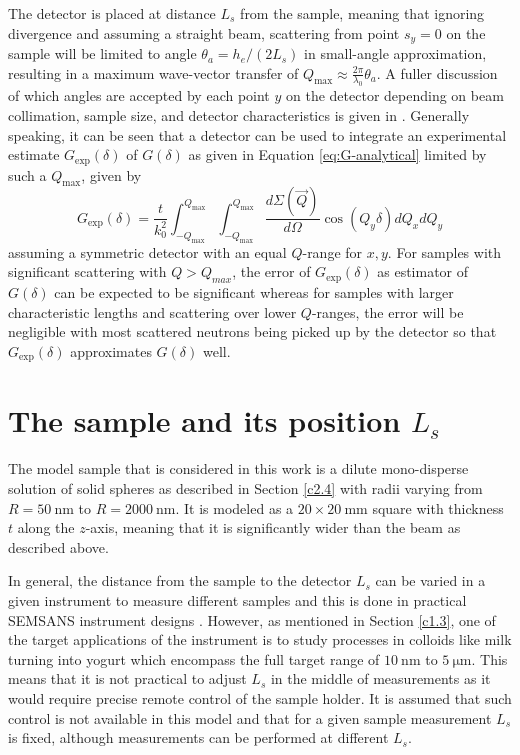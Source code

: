 The detector is placed at distance $L_s$ from the sample, meaning that ignoring divergence and assuming a straight beam, scattering from point $s_y = 0$ on the sample will be limited to angle $\theta_a = h_e/(2L_s)$ in small-angle approximation, resulting in a maximum wave-vector transfer of $Q_\text{max} \approx \frac{2\pi}{\lambda_0}\theta_a$. A fuller discussion of which angles are accepted by each point $y$ on the detector depending on beam collimation, sample size, and detector characteristics is given in \cite{kusmin2017}. Generally speaking, it can be seen that a detector can be used to integrate an experimental estimate $G_\text{exp}(\delta)$ of $G(\delta)$ as given in Equation \eqref{eq:G-analytical} limited by such a $Q_\text{max}$, given by 
\begin{equation}
	G_\text{exp}(\delta) = \frac{t}{k_0^2}\int_{-Q_\text{max}}^{Q_\text{max}}\int_{-Q_\text{max}}^{Q_\text{max}}\dfrac{d\Sigma(\vec{Q})}{d\Omega}\cos(Q_y \delta)dQ_xdQ_y  \label{eq:G-experimental}
\end{equation}
assuming a symmetric detector with an equal $Q$-range for $x,y$. For samples with significant scattering with $Q > Q_{max}$, the error of $G_\text{exp}(\delta)$ as estimator of $G(\delta)$ can be expected to be significant whereas for samples with larger characteristic lengths and scattering over lower $Q$-ranges, the error will be negligible with most scattered neutrons being picked up by the detector \cite{rekveldt1996} so that $G_\text{exp}(\delta)$ approximates $G(\delta)$ well. 

\section{The sample and its position $L_s$}
\label{c3.5}
The model sample that is considered in this work is a dilute mono-disperse solution of solid spheres as described in Section \ref{c2.4} with radii varying from $R = \SI{50}{\nano\meter}$ to $R = \SI{2000}{\nano\meter}$. It is modeled as a $20\times20~\unit{\milli\meter}$ square with thickness $t$ along the $z$-axis, meaning that it is significantly wider than the beam as described above. 

In general, the distance from the sample to the detector $L_s$ can be varied in a given instrument to measure different samples and this is done in practical SEMSANS instrument designs \cite{kusmin2017}. However, as mentioned in Section \ref{c1.3}, one of the target applications of the instrument is to study processes in colloids like milk turning into yogurt which encompass the full target range of $\SI{10}{\nano\meter}$ to $\SI{5}{\micro\meter}$. This means that it is not practical to adjust $L_s$ in the middle of measurements as it would require precise remote control of the sample holder. It is assumed that such control is not available in this model and that for a given sample measurement $L_s$ is fixed, although measurements can be performed at different $L_s$.  

